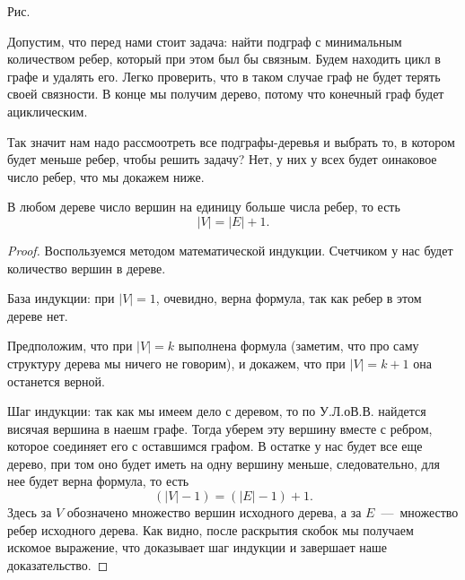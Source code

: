 \begin{center}

	\small Рис. \images
\end{center}


	Допустим, что перед нами стоит задача: найти подграф с минимальным количеством ребер, который при этом был бы связным. Будем находить цикл в графе и удалять его. Легко проверить, что в таком случае граф не будет терять своей связности. В конце мы получим дерево, потому что конечный граф будет ациклическим.
	
	Так значит нам надо рассмоотреть все подграфы-деревья и выбрать то, в котором будет меньше ребер, чтобы решить задачу? Нет, у них у всех будет оинаковое число ребер, что мы докажем ниже.

\begin{statement}
	В любом дереве число вершин на единицу больше числа ребер, то есть $$|V| = |E| + 1.$$
	
\begin{proof}
	Воспользуемся методом математической индукции. Счетчиком у нас будет количество вершин в дереве.
	
	База индукции: при $|V| = 1$, очевидно, верна формула, так как ребер в этом дереве нет.
	
	Предположим, что при $|V| = k$ выполнена формула (заметим, что про саму структуру дерева мы ничего не говорим), и докажем, что при $|V| = k + 1$ она останется верной.
	
	Шаг индукции: так как мы имеем дело с деревом, то по У.Л.оВ.В. найдется висячая вершина в наешм графе. Тогда уберем эту вершину вместе с ребром, которое соединяет его с оставшимся графом. В остатке у нас будет все еще дерево, при том оно будет иметь на одну вершину меньше, следовательно, для нее будет верна формула, то есть $$\left(|V| - 1\right) = \left(|E| - 1\right) + 1.$$
	Здесь за $V$ обозначено множество вершин исходного дерева, а за $E$~---~множество ребер исходного дерева. Как видно, после раскрытия скобок мы получаем искомое выражение, что доказывает шаг индукции и завершает наше доказательство.
\end{proof}
\end{statement}

